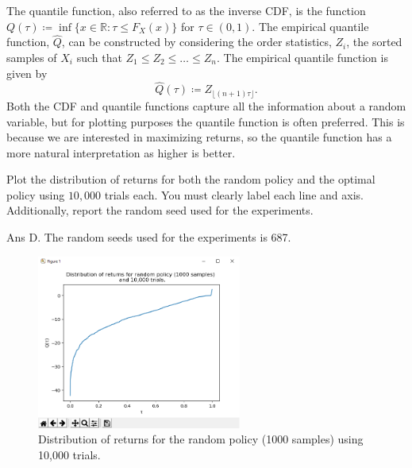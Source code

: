 \documentclass[]{article}
\begin{document}
\begin{enumerate}[label=\Alph*]
    The quantile function, also referred to as the inverse CDF, is the function $Q(\tau) \coloneqq \inf \{ x \in \mathbb{R} \colon \tau \le F_X(x) \}$ for $\tau \in (0,1)$. The empirical quantile function, $\hat Q$, can be constructed by considering the order statistics, $Z_i$, the sorted samples of $X_i$ such that $Z_1 \le Z_2 \le \dotsc \le Z_n$. The empirical quantile function is given by
    \begin{equation*}
        \hat Q(\tau) \coloneqq Z_{\lfloor (n+1)\tau \rfloor}.
    \end{equation*}
    Both the CDF and quantile functions capture all the information about a random variable, but for plotting purposes the quantile function is often preferred. This is because we are interested in maximizing returns, so the quantile function has a more natural interpretation as higher is better. 
    
    Plot the distribution of returns for both the random policy and the optimal policy using $10,\!000$ trials each. You must clearly label each line and axis. Additionally, report the random seed used for the experiments. 

	{
		\color{blue}
		Ans D. The random seeds used for the experiments is 687.
		
		\begin{figure}[H]
		    \centering
		    \includegraphics[width=0.6\textwidth]{watery_2.png}
		    \caption{Distribution of returns for the random policy (1000 samples) using 10,000 trials.}
		    \label{fig: watery gridworld distribution policy}
		\end{figure}
		
}
\end{enumerate}
\end{document}
